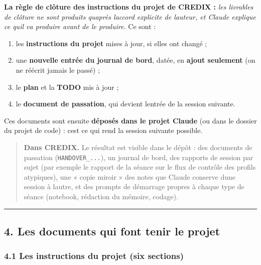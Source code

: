 \documentclass[
  french,
  11pt,
  a4paper,
]{article}
\providecommand{\tightlist}{%
  \setlength{\itemsep}{0pt}\setlength{\parskip}{0pt}}
\begin{document}
\textbf{La règle de clôture des instructions du projet de CREDIX :}
\emph{les livrables de clôture ne sont produits qu\textquotesingle après
l\textquotesingle accord explicite de l\textquotesingle auteur, et
Claude explique ce qu\textquotesingle il va produire avant de le
produire.} Ce sont :

\begin{enumerate}
\def\labelenumi{\arabic{enumi}.}
\tightlist
\item
  les \textbf{instructions du projet} mises à jour, si elles ont changé
  ;
\item
  une \textbf{nouvelle entrée du journal de bord}, datée, en
  \textbf{ajout seulement} (on ne réécrit jamais le passé) ;
\item
  le \textbf{plan} et la \textbf{TODO} mis à jour ;
\item
  le \textbf{document de passation}, qui devient
  l\textquotesingle entrée de la session suivante.
\end{enumerate}

Ces documents sont ensuite \textbf{déposés dans le projet Claude} (ou
dans le dossier du projet de code) : c\textquotesingle est ce qui rend
la session suivante possible.

\begin{quote}
\textbf{Dans CREDIX.} Le résultat est visible dans le dépôt : des
documents de passation (\texttt{HANDOVER\_...}), un journal de bord, des
rapports de session par sujet (par exemple le rapport de la séance sur
le flux de contrôle des profils atypiques), une « copie miroir » des
notes que Claude conserve d\textquotesingle une session à
l\textquotesingle autre, et des prompts de démarrage propres à chaque
type de séance (notebook, rédaction du mémoire, codage).
\end{quote}

\begin{center}\rule{0.5\linewidth}{0.5pt}\end{center}

\subsection{4. Les documents qui font tenir le
projet}\label{4-les-documents-qui-font-tenir-le-projet}

\subsubsection{4.1 Les instructions du projet (six
sections)}\label{41-les-instructions-du-projet-six-sections}
\end{document}
